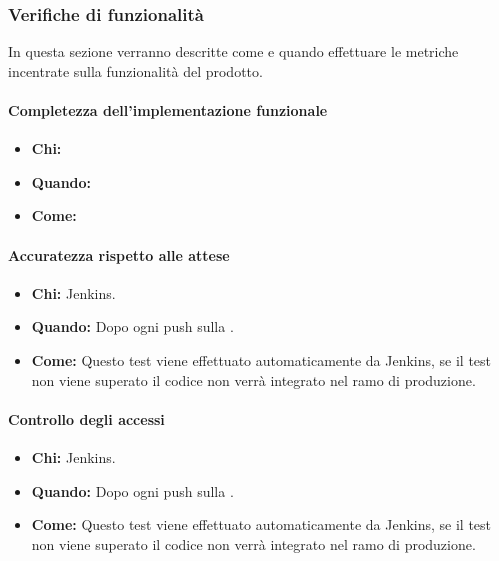 \newpage
\subsubsection{Verifiche di funzionalità}
In questa sezione verranno descritte come e quando effettuare le metriche incentrate sulla funzionalità del prodotto.

\paragraph{Completezza dell’implementazione funzionale}
\begin{itemize}
\item \textbf{Chi:} \Ver
\item \textbf{Quando:}
\item \textbf{Come:}
\end{itemize}

\paragraph{Accuratezza rispetto alle attese}
\begin{itemize}
\item \textbf{Chi:} Jenkins.
\item \textbf{Quando:} Dopo ogni push sulla .
\item \textbf{Come:} Questo test viene effettuato automaticamente da Jenkins, se il test non viene superato il codice non verrà integrato nel ramo di produzione.
\end{itemize}

\paragraph{Controllo degli accessi}
\begin{itemize}
\item \textbf{Chi:} Jenkins.
\item \textbf{Quando:} Dopo ogni push sulla .
\item \textbf{Come:} Questo test viene effettuato automaticamente da Jenkins, se il test non viene superato il codice non verrà integrato nel ramo di produzione.
\end{itemize}